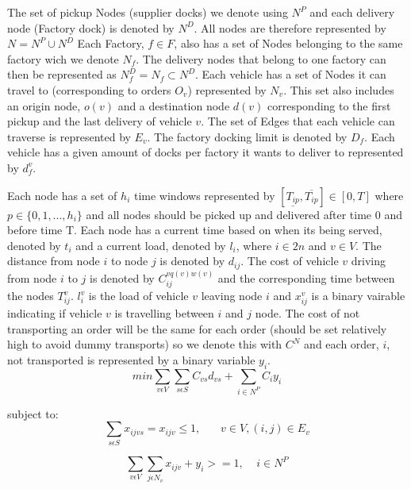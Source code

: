 \documentclass[a4paper,12pt]{article}
\begin{document}
The set of pickup Nodes (supplier docks) we denote using $N^P$ and each delivery node (Factory dock) is denoted by $N^D$. All nodes are therefore represented by $N = N^P \cup N^D$ Each Factory, $f \in F$, also has a set of Nodes belonging to the same factory wich we denote $N_f$. The delivery nodes that belong to one factory can then be represented as $N_f^D = N_f \subset N^D$. 
Each vehicle has a set of Nodes it can travel to (corresponding to orders $O_v$) represented by $N_v$. This set also includes an origin node, $o(v)$ and a destination node $d(v)$ corresponding to the first pickup and the last delivery of vehicle $v$. The set of Edges that each vehicle can traverse is represented by $E_v$. The factory docking limit is denoted by $D_f$. Each vehicle has a given amount of docks per factory it wants to deliver to represented by $d_{f}^v$. \par 
Each node has a set of $h_i$ time windows represented by $[ \underline{T_{ip}},  \overline{T_{ip}} ] \in [0,T]$ where $p \in \{0,1,...,h_i\}$ and all nodes should be picked up and delivered after time 0 and before time T. Each node has a current time based on when its being served, denoted by $t_{i}$ and a current load, denoted by $l_{i}$, where $i \in 2n$ and $v \in V$. The distance from node $i$ to node $j$ is denoted by $d_{ij}$. The cost of vehicle $v$ driving from node $i$ to $j$ is denoted by $C_{ij}^{vq(v)w(v)}$ and the corresponding time between the nodes $T_{ij}^v$. $l_{i}^v$ is the load of vehicle $v$ leaving node $i$ and $x_{ij}^v$ is a binary vairable indicating if vehicle $v$ is travelling between $i$ and $j$ node. The cost of not transporting an order will be the same for each order (should be set relatively high to avoid dummy transports) so we denote this with $C^N$ and each order, $i$,  not transported is represented by a binary variable $y_i$. 
\begin{equation}
\label{eq:1}
min\sum_{v\epsilon V} \sum_{s \epsilon S} C_{vs}d_{vs} + \sum_{i\in N^P}C_iy_i
\end{equation}

subject to:
\begin{equation} \label{eq:2}
    \sum_{s\epsilon S} x_{ijvs} = x_{ijv} \leq 1, ~~~~~~~~ v \in V, (i, j)\in E_v
\end{equation}

\begin{equation} \label{eq:3}
    \sum_{v\epsilon V}\sum_{j\epsilon N_v}x_{ijv} + y_i >= 1, ~~~~~ i \in N^P
\end{equation}
\end{document}
